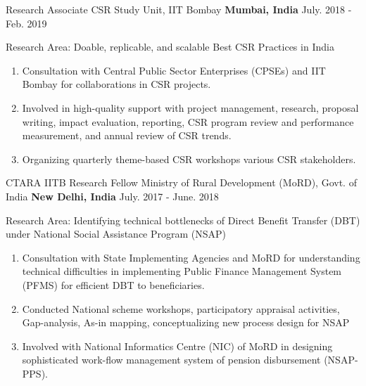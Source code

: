 


\begin{cventries}

\cventry
{Research Associate} %
{CSR Study Unit, IIT Bombay} %
{\textbf{Mumbai, India}} %
{July. 2018 - Feb. 2019} %
{ %
\begin{cvitems}
\item {Research Area: Doable, replicable, and scalable Best CSR Practices in India}
\begin{enumerate}
\item {Consultation with Central Public Sector Enterprises (CPSEs) and IIT Bombay for collaborations in CSR projects.}
\item {Involved in high-quality support with project management, research, proposal writing, impact evaluation, reporting, CSR program review and performance measurement, and annual review of CSR trends.}
\item {Organizing quarterly theme-based CSR workshops various CSR stakeholders.}
\end{enumerate}
\end{cvitems}
}
\cventry
{CTARA IITB Research Fellow} %
{Ministry of Rural Development (MoRD), Govt. of India} %
{\textbf{New Delhi, India}} %
{July. 2017 - June. 2018} %
{ %
\begin{cvitems}
\item {Research Area: Identifying technical bottlenecks of Direct Benefit Transfer (DBT) under National Social Assistance Program (NSAP)}
\begin{enumerate}
\item {Consultation with State Implementing Agencies and MoRD for understanding technical difficulties in implementing Public Finance Management System (PFMS) for efficient DBT to beneficiaries.}
\item {Conducted National scheme workshops, participatory appraisal activities, Gap-analysis, As-in mapping, conceptualizing new process design for NSAP}
\item {Involved with National Informatics Centre (NIC) of MoRD in designing sophisticated work-flow management system of pension disbursement (NSAP-PPS).}
\end{enumerate}
\end{cvitems}
}
\end{cventries}